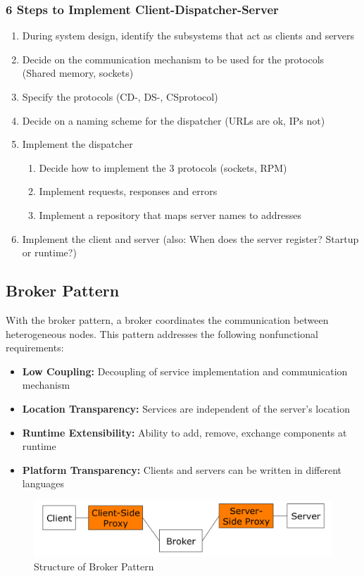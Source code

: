 \subsubsection*{6 Steps to Implement Client-Dispatcher-Server}
\begin{enumerate}
  \item During system design, identify the subsystems that act as clients and servers
  \item Decide on the communication mechanism to be used for the protocols (Shared memory, sockets)
  \item Specify the protocols (CD-, DS-, CSprotocol)
  \item Decide on a naming scheme for the dispatcher (URLs are ok, IPs not)
  \item Implement the dispatcher
  \begin{enumerate}
    \item Decide how to implement the 3 protocols (sockets, RPM)
    \item Implement requests, responses and errors
    \item Implement a repository that maps server names to addresses
  \end{enumerate}
  \item Implement the client and server (also: When does the server register? Startup or runtime?)
\end{enumerate}
\newpage

\subsection{Broker Pattern}
With the broker pattern, a broker coordinates the communication between heterogeneous nodes. This pattern addresses the following nonfunctional requirements:
\begin{itemize}[noitemsep]
  \item \textbf{Low Coupling:} Decoupling of service implementation and communication mechanism
  \item \textbf{Location Transparency:} Services are independent of the server's location
  \item \textbf{Runtime Extensibility:} Ability to add, remove, exchange components at runtime
  \item \textbf{Platform Transparency:} Clients and servers can be written in different languages
\end{itemize}

\begin{figure}[H]
	\centering
	\includegraphics[width=0.9\linewidth]{images/pattern_broker.png}
	\caption{Structure of Broker Pattern}
\end{figure}

